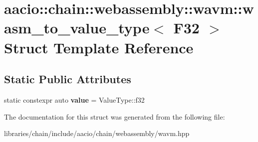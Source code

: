 \hypertarget{structaacio_1_1chain_1_1webassembly_1_1wavm_1_1wasm__to__value__type_3_01_f32_01_4}{}\section{aacio\+:\+:chain\+:\+:webassembly\+:\+:wavm\+:\+:wasm\+\_\+to\+\_\+value\+\_\+type$<$ F32 $>$ Struct Template Reference}
\label{structaacio_1_1chain_1_1webassembly_1_1wavm_1_1wasm__to__value__type_3_01_f32_01_4}
\subsection*{Static Public Attributes}
\begin{DoxyCompactItemize}
\item 
\mbox{\label{structaacio_1_1chain_1_1webassembly_1_1wavm_1_1wasm__to__value__type_3_01_f32_01_4_a834303ce516fd60be10aaccad9328c45}} 
static constexpr auto {\bfseries value} = Value\+Type\+::f32
\end{DoxyCompactItemize}


The documentation for this struct was generated from the following file\+:\begin{DoxyCompactItemize}
\item 
libraries/chain/include/aacio/chain/webassembly/wavm.\+hpp\end{DoxyCompactItemize}
